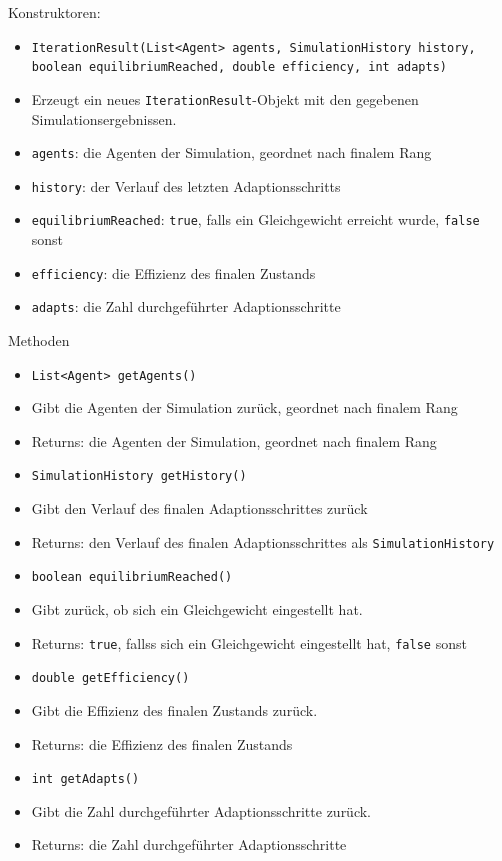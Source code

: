 \documentclass[parskip=full,11pt]{scrartcl}
\begin{document}
Konstruktoren:
\begin{itemize}\itemsep -10pt
\item \texttt{IterationResult(List<Agent> agents, SimulationHistory history, boolean equilibriumReached, double efficiency, int adapts)}
\item[] Erzeugt ein neues \texttt{IterationResult}-Objekt mit den gegebenen Simulationsergebnissen.
\item[] \texttt{agents}: die Agenten der Simulation, geordnet nach finalem Rang
\item[] \texttt{history}: der Verlauf des letzten Adaptionsschritts
\item[] \texttt{equilibriumReached}: \texttt{true}, falls ein Gleichgewicht erreicht wurde, \texttt{false} sonst
\item[] \texttt{efficiency}: die Effizienz des finalen Zustands
\item[] \texttt{adapts}: die Zahl durchgeführter Adaptionsschritte
\end{itemize}

Methoden
\begin{itemize}\itemsep -10pt
\item \texttt{List<Agent> getAgents()}
\item[] Gibt die Agenten der Simulation zurück, geordnet nach finalem Rang
\item[] Returns: die Agenten der Simulation, geordnet nach finalem Rang

\item \texttt{SimulationHistory getHistory()}
\item[] Gibt den Verlauf des finalen Adaptionsschrittes zurück
\item[] Returns: den Verlauf des finalen Adaptionsschrittes als \texttt{SimulationHistory}

\item \texttt{boolean equilibriumReached()}
\item[] Gibt zurück, ob sich ein Gleichgewicht eingestellt hat.
\item[] Returns: \texttt{true}, fallss sich ein Gleichgewicht eingestellt hat, \texttt{false} sonst

\item \texttt{double getEfficiency()}
\item[] Gibt die Effizienz des finalen Zustands zurück.
\item[] Returns: die Effizienz des finalen Zustands

\item \texttt{int getAdapts()}
\item[] Gibt die Zahl durchgeführter Adaptionsschritte zurück.
\item[] Returns: die Zahl durchgeführter Adaptionsschritte
\end{itemize}
\end{document}
